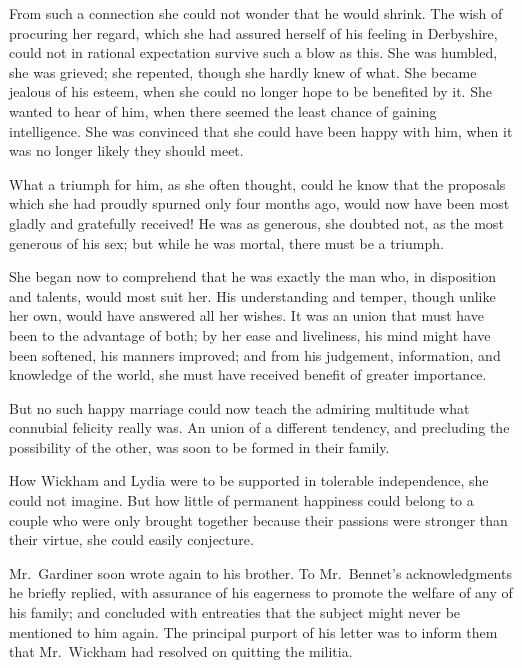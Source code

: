 \documentclass[12pt,english]{book}
\begin{document}
From such a connection she could not wonder that he would shrink.
The wish of procuring her regard, which she had assured herself of
his feeling in Derbyshire, could not in rational expectation survive
such a blow as this. She was humbled, she was grieved; she repented,
though she hardly knew of what. She became jealous of his esteem,
when she could no longer hope to be benefited by it. She wanted to
hear of him, when there seemed the least chance of gaining intelligence.
She was convinced that she could have been happy with him, when it
was no longer likely they should meet.

What a triumph for him, as she often thought, could he know that the
proposals which she had proudly spurned only four months ago, would
now have been most gladly and gratefully received! He was as generous,
she doubted not, as the most generous of his sex; but while he was
mortal, there must be a triumph.

She began now to comprehend that he was exactly the man who, in disposition
and talents, would most suit her. His understanding and temper, though
unlike her own, would have answered all her wishes. It was an union
that must have been to the advantage of both; by her ease and liveliness,
his mind might have been softened, his manners improved; and from
his judgement, information, and knowledge of the world, she must have
received benefit of greater importance.

But no such happy marriage could now teach the admiring multitude
what connubial felicity really was. An union of a different tendency,
and precluding the possibility of the other, was soon to be formed
in their family.

How Wickham and Lydia were to be supported in tolerable independence,
she could not imagine. But how little of permanent happiness could
belong to a couple who were only brought together because their passions
were stronger than their virtue, she could easily conjecture.

\bigskip{} Mr.\ Gardiner soon wrote again to his brother. To Mr.\ Bennet's
acknowledgments he briefly replied, with assurance of his eagerness
to promote the welfare of any of his family; and concluded with entreaties
that the subject might never be mentioned to him again. The principal
purport of his letter was to inform them that Mr.\ Wickham had resolved
on quitting the militia.
\end{document}

